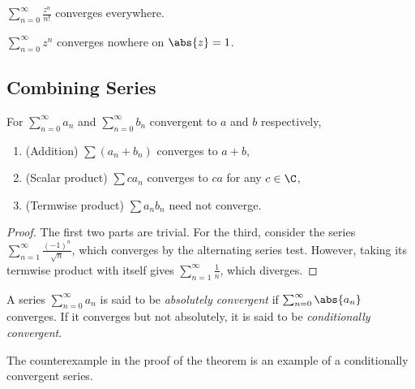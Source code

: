 \begin{examples}
    \item $\sum_{n=0}^{\infty} \frac{z^n}{n!}$ converges everywhere.
    \item $\sum_{n=0}^{\infty} z^n$ converges nowhere on $\abs{z} = 1$.
    \item 
\end{examples}

\subsection{Combining Series} \label{sec:series:combinations}
\begin{theorem}
    For $\sum_{n=0}^{\infty} a_n$ and $\sum_{n=0}^{\infty} b_n$ convergent
    to $a$ and $b$ respectively,
    \begin{enumerate}
        \item (Addition)
        $\sum (a_n + b_n)$ converges to $a + b$,
        \item (Scalar product)
        $\sum c a_n$ converges to $c a$ for any $c \in \C$,
        \item (Termwise product)
        $\sum a_n b_n$ need not converge.
    \end{enumerate}
\end{theorem}
\begin{proof}
    The first two parts are trivial.
    For the third, consider the series
    $\sum_{n=1}^{\infty} \frac{(-1)^n}{\sqrt n}$,
    which converges by the alternating series test.
    However, taking its termwise product with itself gives
    $\sum_{n=1}^{\infty} \frac{1}{n}$, which diverges.
\end{proof}

\begin{definition} \label{def:series:abs}
    A series $\sum_{n=0}^{\infty} a_n$ is said to be \emph{absolutely
    convergent} if $\sum_{n=0}^{\infty} \abs{a_n}$ converges.
    If it converges but not absolutely, it is said to be \emph{conditionally
    convergent}.
\end{definition}
The counterexample in the proof of the theorem is an example of a
conditionally convergent series.

